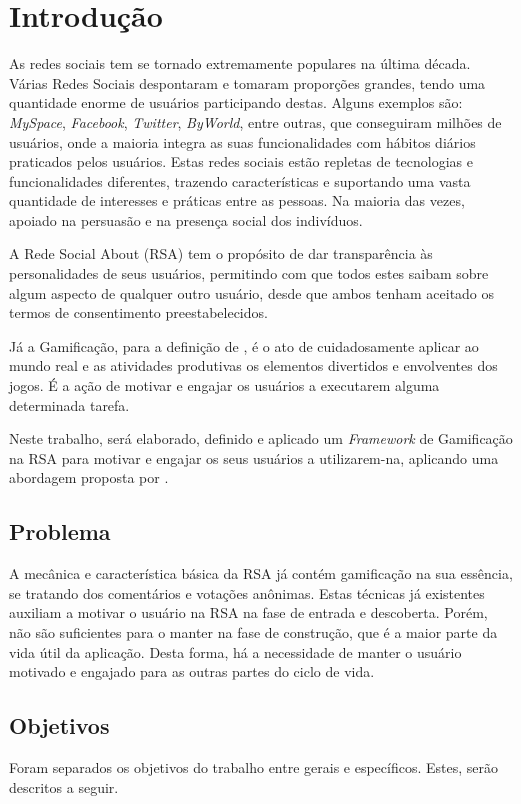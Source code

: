 \chapter[Introdução]{Introdução}
As redes sociais tem se tornado extremamente populares na última década.
Várias
Redes Sociais despontaram e tomaram proporções grandes, tendo uma quantidade enorme de usuários
participando destas. Alguns exemplos são: \textit{MySpace}, \textit{Facebook}, \textit{Twitter},
\textit{ByWorld}, entre outras, que conseguiram milhões de usuários, onde a maioria integra
as suas funcionalidades com hábitos diários praticados pelos usuários.
Estas redes sociais estão repletas de tecnologias e funcionalidades diferentes,
trazendo características e suportando uma vasta quantidade de interesses e práticas
entre as pessoas. Na maioria das vezes, apoiado na persuasão e na presença social
dos indivíduos.

A Rede Social About (RSA) tem o propósito de dar transparência às personalidades de seus usuários, permitindo com que todos
estes saibam sobre algum aspecto de qualquer outro usuário, desde que ambos tenham aceitado os
termos de consentimento preestabelecidos.

Já a Gamificação, para a definição de \cite{chou2015actionable},  é o ato de cuidadosamente aplicar ao mundo
real e as atividades produtivas os elementos divertidos e envolventes dos jogos.
É a ação de  motivar e engajar os usuários a executarem alguma determinada
tarefa. 

Neste trabalho, será elaborado, definido e aplicado um \textit{Framework} de Gamificação na RSA 
para motivar e engajar os seus usuários a utilizarem-na, aplicando uma abordagem proposta por \cite{chou2015actionable}.

\section{Problema}
A mecânica e característica básica da RSA já contém gamificação na sua essência, se tratando dos comentários e votações anônimas.
Estas técnicas já existentes auxiliam a motivar o usuário na RSA na fase de
entrada e descoberta. Porém, não são suficientes para o manter na fase de
construção, que é a maior parte da vida útil da aplicação. Desta forma, há
a necessidade de manter o usuário motivado e engajado para as outras partes
do ciclo de vida.

\section{Objetivos}
Foram separados os objetivos do trabalho entre gerais e específicos. Estes, serão
descritos a seguir.
